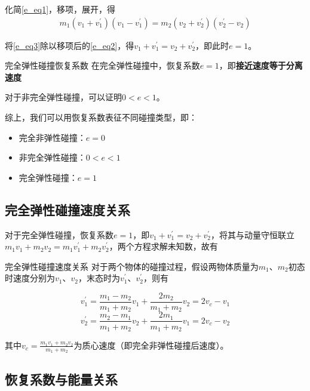 化简\eqref{e_eq1}，移项，展开，得
\begin{subequations}
\begin{align}
\label{e_eq3}
m_1 (v_1 + v_1^{\prime})(v_1 - v_1^{\prime}) = m_2 (v_2 + v_2^{\prime})(v_2^{\prime} - v_2)  
\end{align}
\end{subequations}

将\eqref{e_eq3}除以移项后的\eqref{e_eq2}，得$v_1 + v_1^{\prime} = v_2 + v_2^{\prime}$，即此时$e=1$。

\begin{theo}{完全弹性碰撞恢复系数}{}
在完全弹性碰撞中，恢复系数$e=1$，即\textbf{接近速度等于分离速度}
\end{theo}

对于非完全弹性碰撞，可以证明$0 < e <1$。

综上，我们可以用恢复系数表征不同碰撞类型，即：

\begin{itemize}
	\item 完全非弹性碰撞：$e = 0$
	\item 非完全弹性碰撞：$0 < e < 1$
	\item 完全弹性碰撞：$e = 1$
\end{itemize}

\subsection{完全弹性碰撞速度关系}

对于完全弹性碰撞，恢复系数$e=1$，即$v_1 + v_1^{\prime} = v_2 + v_2^{\prime}$，将其与动量守恒联立$m_1 v_1 + m_2 v_2 = m_1 v_1^{\prime} + m_2 v_2^{\prime}$，两个方程求解未知数，故有

\begin{theo}{完全弹性碰撞速度关系}{}
对于两个物体的碰撞过程，假设两物体质量为$m_1$、$m_2$初态时速度分别为$v_1$、$v_2$，末态时为$v_1^{\prime}$、$v_2^{\prime}$，则有

$$v_1^{\prime} = \frac{m_1 - m_2}{m_1 + m_2} v_1 + \frac{2 m_2}{m_1 + m_2} v_2 = 2 v_c - v_1$$
$$v_2^{\prime} = \frac{m_2 - m_1}{m_1 + m_2} v_2 + \frac{2 m_1}{m_1 + m_2} v_1 = 2 v_c - v_2$$

其中$v_c = \frac{m_1 v_1 + m_2 v_2}{m_1+m_2}$为质心速度（即完全非弹性碰撞后速度）。
\end{theo}

\subsection{恢复系数与能量关系}

